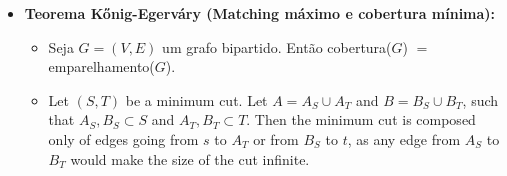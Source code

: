 \begin{itemize}
\begin{itemize}
        \end{itemize}
        \item \textbf{Teorema Kőnig-Egerváry (Matching máximo e cobertura mínima):}
        \begin{itemize}
            \item Seja $G=(V, E)$ um grafo bipartido. Então cobertura($G$) $=$ emparelhamento($G$).
            \item Let 
$\displaystyle (S,T)$ be a minimum cut. Let 
$\displaystyle A=A_{S}\cup A_{T}$ and 
$\displaystyle B=B_{S}\cup B_{T}$, such that 
$\displaystyle A_{S},B_{S}\subset S$ and 
$\displaystyle A_{T},B_{T}\subset T$. Then the minimum cut is composed only of edges going from
$\displaystyle s$ to 
$\displaystyle A_{T}$ or from 
$\displaystyle B_{S}$ to 
$\displaystyle t$, as any edge from 
$\displaystyle A_{S}$ to 
$\displaystyle B_{T}$ would make the size of the cut infinite.


\end{itemize}
\end{itemize}
